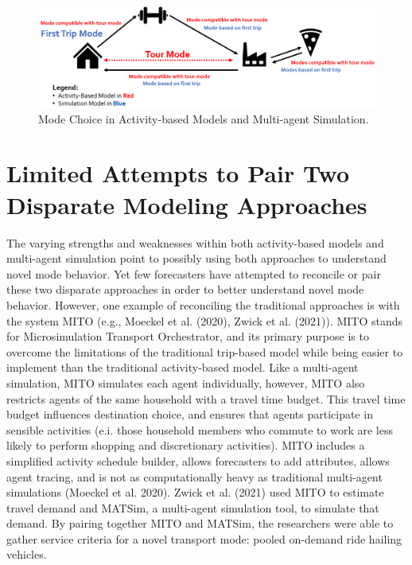 \documentclass[12pt, oneside, openright]{byuthesis}
\begin{document}
\begin{figure}

{\centering \includegraphics[width=1\linewidth]{pics/abm-mas-compare} 

}

\caption{Mode Choice in Activity-based Models and Multi-agent Simulation.}\label{fig:fig-mode-compare}
\end{figure}

\hypertarget{limited-attempts-to-pair-two-disparate-modeling-approaches}{%
\section{Limited Attempts to Pair Two Disparate Modeling Approaches}\label{limited-attempts-to-pair-two-disparate-modeling-approaches}}

The varying strengths and weaknesses within both activity-based models and multi-agent simulation point to possibly using both approaches to understand novel mode behavior. Yet few forecasters have attempted to reconcile or pair these two disparate approaches in order to better understand novel mode behavior. However, one example of reconciling the traditional approaches is with the system MITO (e.g., Moeckel et al. (2020), Zwick et al. (2021)). MITO stands for Microsimulation Transport Orchestrator, and its primary purpose is to overcome the limitations of the traditional trip-based model while being easier to implement than the traditional activity-based model. Like a multi-agent simulation, MITO simulates each agent individually, however, MITO also restricts agents of the same household with a travel time budget. This travel time budget influences destination choice, and ensures that agents participate in sensible activities (e.i. those household members who commute to work are less likely to perform shopping and discretionary activities). MITO includes a simplified activity schedule builder, allows forecasters to add attributes, allows agent tracing, and is not as computationally heavy as traditional multi-agent simulations (Moeckel et al. 2020). Zwick et al. (2021) used MITO to estimate travel demand and MATSim, a multi-agent simulation tool, to simulate that demand. By pairing together MITO and MATSim, the researchers were able to gather service criteria for a novel transport mode: pooled on-demand ride hailing vehicles.
\end{document}
